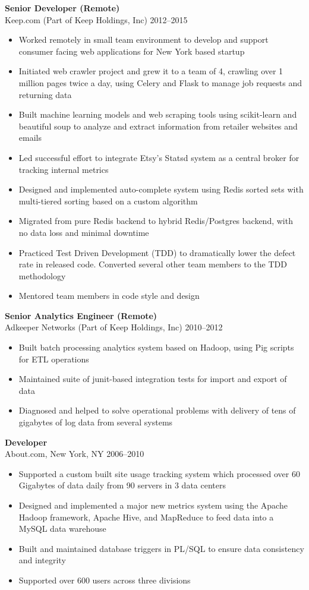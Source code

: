 \documentclass[margin]{res}
\begin{document}
\begin{resume}
{\bf Senior Developer (Remote)}\\
    Keep.com (Part of Keep Holdings, Inc) \hfill 2012--2015
\begin{itemize}
  \item Worked remotely in small team environment to develop and support
      consumer facing web applications for New York based startup
  \item Initiated web crawler project and grew it to a team of 4, crawling
    over 1 million pages twice a day, using Celery and Flask to manage job
    requests and returning data
  \item Built machine learning models and web scraping tools using
    scikit-learn and beautiful soup to analyze and extract information from
    retailer websites and emails
  \item Led successful effort to integrate Etsy's Statsd system as a central
    broker for tracking internal metrics
  \item Designed and implemented auto-complete system using Redis sorted sets
    with multi-tiered sorting based on a custom algorithm
  \item Migrated from pure Redis backend to hybrid Redis/Postgres backend,
      with no data loss and minimal downtime
  \item Practiced Test Driven Development (TDD) to dramatically lower the
      defect rate in released code.  Converted several other team members to
      the TDD methodology
  \item Mentored team members in code style and design
\end{itemize}

{\bf Senior Analytics Engineer (Remote)}\\
Adkeeper Networks (Part of Keep Holdings, Inc) \hfill  2010--2012
\begin{itemize}
  \item Built batch processing analytics system based on Hadoop, using Pig
      scripts for ETL operations
  \item Maintained suite of junit-based integration tests for import and
      export of data
  \item Diagnosed and helped to solve operational problems with delivery of
      tens of gigabytes of log data from several systems
\end{itemize}

{\bf Developer}\\
About.com, New York, NY \hfill  2006--2010
\begin{itemize}
  \item Supported a custom built site usage tracking system which processed
    over 60 Gigabytes of data daily from 90 servers in 3 data centers
  \item Designed and implemented a major new metrics system using the Apache
    Hadoop framework, Apache Hive, and MapReduce to feed data into a MySQL data
    warehouse
  \item Built and maintained database triggers in PL/SQL to ensure data
    consistency and integrity
  \item Supported over 600 users across three divisions
\end{itemize}


\end{resume}
\end{document}
